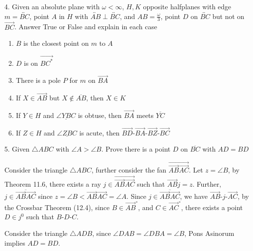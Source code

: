 \documentclass{report}
\begin{document}
    \bigbreak \noindent 
    \begin{mdframed}
        4. Given an absolute plane with $\omega < \infty$, $H,K$ opposite halfplanes with edge $m = \overleftrightarrow{BC}$, point $A$ in $H$ with $ \overleftrightarrow{AB} \perp \overleftrightarrow{BC}$, and $AB = \frac{\omega}{3} $, point $D$ on $\overleftrightarrow{BC}$ but not on $\overrightarrow{BC} $. Answer True or False and explain in each case
        \begin{enumerate}[label=(\alph*)]
            \item $B$ is the closest point on $m$ to $A$
            \item $D$ is on $\overrightarrow{BC^{*}} $
            \item There is a pole $P$ for $m$ on $\overrightarrow{BA}$
            \item If $X \in \overrightarrow{AB}$ but $X \not\in \overline{AB}$, then $X \in  K$
            \item If $Y \in H$ and $ \underline{\angle YBC}$ is obtuse, then $\overrightarrow{BA}$ meets $\overline{YC} $
            \item If $Z \in H$ and $ \underline{\angle ZBC}$ is acute, then $ \overrightarrow{BD}\text{-}\overrightarrow{BA}\text{-}\overrightarrow{BZ}\text{-}\overrightarrow{BC} $
        \end{enumerate}
    \end{mdframed}

    \bigbreak \noindent 
    \begin{mdframed}
        5. Given $\triangle ABC$ with $\angle A > \angle B$. Prove there is a point $D$ on $\overline{BC}$ with $AD = BD$
    \end{mdframed}
    \bigbreak \noindent 
    Consider the triangle $\triangle ABC$, further consider the fan $\overrightarrow{\overrightarrow{AB}\overrightarrow{AC}}$. Let $ z = \angle B$, by Theorem 11.6, there exists a ray $j \in \overrightarrow{\overrightarrow{AB}\overrightarrow{AC}}$ such that $\overrightarrow{AB}j = z$. Further, $j \in \overline{\overrightarrow{AB}\overrightarrow{AC}} $ since $ z = \angle B < \overrightarrow{AB}\overrightarrow{AC} = \angle A $.
    \bigbreak \noindent 
    Since $j \in \overline{\overrightarrow{AB}\overrightarrow{AC}}$, we have $ \overrightarrow{AB}\text{-}j\text{-}\overrightarrow{AC}$,  by the Crossbar Theorem (12.4), since $B \in \overrightarrow{AB}^{\circ}$, and $C \in \overrightarrow{AC}^{\circ}$, there exists a point $D \in j^{0}$ such that $ B\text{-}D\text{-}C$. 
    \begin{figure}[ht]
        \centering
        \label{fig:tri1}
    \end{figure}
    \bigbreak \noindent 
    Consider the triangle $\triangle ADB$, since $ \angle DAB = \angle DBA = \angle B$, Pons Asinorum implies $ AD = BD$.
\end{document}
